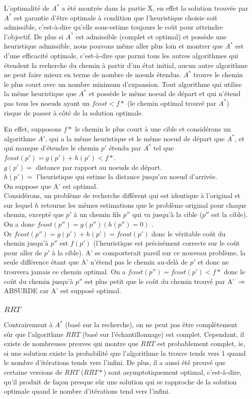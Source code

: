 \documentclass{article}
\begin{document}
L'optimalité de $A^*$ a été montrée dans la partie X,  en effet la solution trouvée par $A^*$ est garantie d'être optimale à condition que l'heuristique choisie soit admissible, c'est-à-dire qu'elle sous-estime toujours le coût pour atteindre l'objectif.
De plus si $A^*$ est admissible (complet et optimal) et possède une heuristique admissible, nous pouvons même aller plus loin et montrer que $A^*$ est d'une efficacité optimale, c'est-à-dire que parmi tous les autres algorithmes qui étendent la recherche du chemin à partir d'un état initial, aucun autre algorithme ne peut faire mieux en terme de  nombre de nœuds étendus. $A^*$ trouve le chemin le plus court avec un nombre minimum d'expansion. 
Tout algorithme qui utilise la même heuristique que $A^*$ et possède le même noeud de départ et qui n'étend pas tous les noeuds ayant un $fcost < f*$ (le chemin optimal trouvé par $A^*$) risque de passer à côté de la solution optimale.

En effet, supposons $f*$ le chemin le plus court à une cible et considérons un algorithme $A'$, qui a la même heuristique et le même noeud de départ que $A^*$, et qui manque d'étendre le chemin $p'$ étendu par $A^*$ tel que $fcost(p') = g(p')+h(p') < f*$. \\
$g(p') =$ distance par rapport au noeuds de départ. \\
$h(p') =$ l'heuristique qui estime la distance jusqu'au noeud d'arrivée. \\
On suppose que A' est optimal. \\
Considérons, un problème de recherche différent qui est identique à l'original et sur lequel $h$ retourne les mêmes estimations que le problème original pour chaque chemin, excepté que $p'$ à un chemin fils $p''$ qui va jusqu'à la cible ($p''$ est la cible). \\
On a donc $fcost(p'') = g(p'') (h(p'') = 0)$ .\\
Or $fcost(p'') = g(p') + h(p') = fcost(p')$ donc le véritable coût du chemin jusqu'à $p''$ est $f(p')$ (l'heuristique est précisément correcte sur le coût pour aller de $p'$ à la cible).
A' se comporterait pareil sur ce nouveau problème, la seule différence étant que A' n'étend pas le chemin au-delà de $p'$ et donc ne trouvera jamais ce chemin optimal.
On a $fcost(p'') = fcost(p') < f*$ donc le coût du chemin jusqu'à $p''$ est plus petit que le coût du chemin trouvé par A' $\Rightarrow$ ABSURDE car A' est supposé optimal.

\subsubsection{$RRT$}
Contrairement à $A^*$ (basé sur la recherche), on ne peut pas être complètement sûr que l'algorithme $RRT$ (basé sur l'échantillonnage) est complet. Cependant, il existe de nombreuses preuves qui montre que $RRT$ est probablement complet, ie, si une solution existe la probabilité que l'algorithme la trouve tends vers 1 quand le nombre d'itérations tends vers l'infini. De plus, il a aussi été prouvé que certaine versions de $RRT$ ($RRT*$) sont asymptotiquement optimal, c'est-à-dire, qu'il produit de façon presque sûr une solution qui se rapproche de la solution optimale quand le nombre d'itérations tend vers l'infini.
\end{document}

